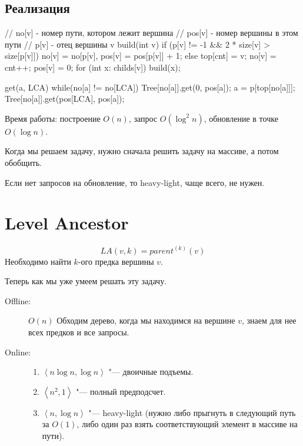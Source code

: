 \subsection{Реализация}

\begin{cppcode}
// no[v] - номер пути, котором лежит вершина
// pos[v] - номер вершины в этом пути
// p[v] - отец вершины v
build(int v) {
	if (p[v] != -1 && 2 * size[v] > size[p[v]]) {
		no[v] = no[p[v], pos[v] = pos[p[v]] + 1;
	} else {
		top[cnt] = v;
		no[v] = cnt++;
		pos[v] = 0;
	}
	for (int x: childs[v])
		build(x);
}

get(a, LCA) {
	while(no[a] != no[LCA]) {
		Tree[no[a]].get(0, pos[a]);
		a = p[top[no[a]]];
	}
	Tree[no[a]].get(pos[LCA], pos[a]);
}
\end{cppcode}

Время работы: построение $O(n)$, запрос $O(\log^2 n)$, обновление в точке $O(\log n)$.

\begin{Rem}
	Когда мы решаем задачу, нужно сначала решить задачу на массиве, а потом обобщить.
\end{Rem}

Если нет запросов на обновление, то heavy-light, чаще всего, не нужен.

\section{Level Ancestor}

\begin{Def}
	\[ LA(v, k) = parent^{(k)}(v) \]
	Необходимо найти $k$-ого предка вершины $v$.
\end{Def}

Теперь как мы уже умеем решать эту задачу.
\begin{description}
\item[Offline:]
	$O(n)$
	Обходим дерево, когда мы находимся на вершине $v$, знаем для нее всех предков и все запросы.

\item[Online:]
	\begin{enumerate}
	\item
		$\left<n\log n, \log n\right>$ "--- двоичные подъемы.

	\item
		$\left<n^2, 1\right>$ "--- полный предподсчет.

	\item
		$\left<n, \log n\right>$ "--- heavy-light (нужно либо прыгнуть в следующий путь за $O(1)$,
		либо один раз взять соответствующий элемент в массиве на пути).
	\end{enumerate}
\end{description}

